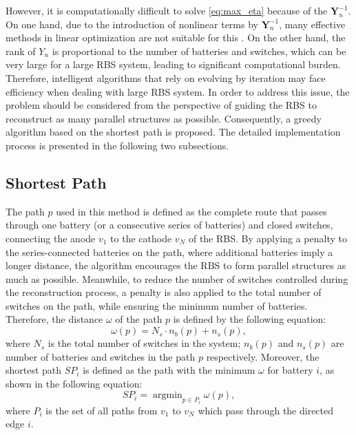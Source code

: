 \documentclass{article}
\begin{document}
However, it is  computationally difficult to solve \ref{eq:max_eta} because of the $\bm{Y}_n^{-1}$.
On one hand, due to the introduction of nonlinear terms by $\bm{Y}_n^{-1}$, many effective methods in linear optimization are not suitable for this .
On the other hand, the rank of $Y_{n}$ is proportional to the number of batteries and switches, which can be very large for a large RBS system, leading to significant computational burden.
Therefore, intelligent algorithms that rely on evolving by iteration may face efficiency  when dealing with large RBS system.
In order to address this issue, the problem should be considered from the perspective of guiding the RBS to reconstruct as many parallel structures as possible.
Consequently, a greedy algorithm based on the shortest path is proposed. 
The detailed implementation process is presented in the following two subsections.

\subsection{Shortest Path}

The path $p$ used in this method is defined as the complete route that passes through one battery (or a consecutive series of batteries) and closed switches, connecting the anode $v_1$ to the cathode $v_N$ of the RBS.
By applying a penalty to the series-connected batteries on the path, where additional batteries imply a longer distance, the algorithm encourages the RBS to form parallel structures as much as possible.
Meanwhile, to reduce the number of switches controlled during the reconstruction process, a penalty is also applied to the total number of switches on the path, while ensuring the minimum number of batteries.
Therefore, the distance $\omega$ of the path $p$ is defined by the following equation: 
\begin{equation}\label{eq:weight}
    \omega(p) = N_s \cdot n_b (p) + n_s (p),
\end{equation}
where $N_s$ is the total number of switches in the system; 
$n_b(p)$ and $n_s(p)$ are number of batteries and switches in the path $p$ respectively. 
Moreover, the shortest path $SP_i$ is defined as the path with the minimum $\omega$ for battery $i$, as shown in the following equation:
\begin{equation}\label{eq:def_sp}
    SP_i = \mathop{\arg\min}_{p \in P_i} \omega(p),
\end{equation}
where $P_i$ is the set of all paths from $v_1$ to $v_N$ which pass through the directed edge $i$.
\end{document}
